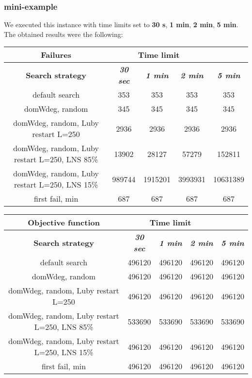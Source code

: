 \subsubsection{mini-example}
We executed this instance with time limits set to \textbf{30 s}, \textbf{1 min}, \textbf{2 min}, \textbf{5 min}.\\
The obtained results were the following:
{
\renewcommand{\arraystretch}{2}
\begin{longtable}[h]{| c | c | c | c | c |}
    \hline
    \textbf{Failures} & \multicolumn{3}{c}{Time limit} & \\
    \hline
    \textbf{Search strategy} & \textbf{\textit{30 sec}} & \textbf{\textit{1 min}} & \textbf{\textit{2 min}} & \textbf{\textit{5 min}} \\
    \hline
    \endhead
    default search                                &    353 &     353 &     353 &      353 \\
    \hline
    domWdeg, random                               &    345 &     345 &     345 &      345 \\
    \hline
    domWdeg, random, Luby restart L=250           &   2936 &    2936 &    2936 &     2936 \\
    \hline
    domWdeg, random, Luby restart L=250, LNS 85\% &  13902 &   28127 &   57279 &   152811 \\
    \hline
    domWdeg, random, Luby restart L=250, LNS 15\% & 989744 & 1915201 & 3993931 & 10631389 \\
    \hline
    first fail, min                               &    687 &     687 &     687 &      687 \\
    \hline
\end{longtable}
}

{
\renewcommand{\arraystretch}{2}
\begin{longtable}[h]{| c | c | c | c | c |}
    \hline
    \textbf{Objective function} & \multicolumn{3}{c}{Time limit} & \\
    \hline
    \textbf{Search strategy} & \textbf{\textit{30 sec}} & \textbf{\textit{1 min}} & \textbf{\textit{2 min}} & \textbf{\textit{5 min}} \\
    \hline
    \endhead
    default search                                & 496120 & 496120 & 496120 & 496120 \\
    \hline
    domWdeg, random                               & 496120 & 496120 & 496120 & 496120 \\
    \hline
    domWdeg, random, Luby restart L=250           & 496120 & 496120 & 496120 & 496120 \\
    \hline
    domWdeg, random, Luby restart L=250, LNS 85\% & 533690 & 533690 & 533690 & 533690 \\
    \hline
    domWdeg, random, Luby restart L=250, LNS 15\% & 496120 & 496120 & 496120 & 496120 \\
    \hline
    first fail, min                               & 496120 & 496120 & 496120 & 496120 \\
    \hline
\end{longtable}
}